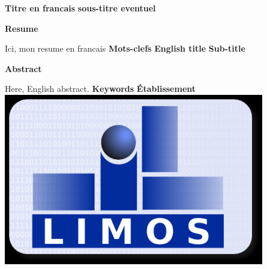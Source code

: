\clearpage
\ifodd\thepage\hbox{}\newpage\else\fi%
\thispagestyle{empty}\parindent=0pt
{\Large \textbf{Titre en francais}}
{\large \textbf{sous-titre eventuel}}
\hrulefill%
\begin{center}
{\Large \textbf{Resume}}
\end{center}
Ici, mon resume en francais
\hrulefill%
{\Large \textbf{Mots-clefs}}
\hrulefill%
{\Large \textbf{English title}}
{\large \textbf{Sub-title}}
\hrulefill%
\begin{center}
{\Large \textbf{Abstract}}
\end{center}
Here, English abstract.
\hrulefill%
{\Large \textbf{Keywords}}
\hrulefill%
\hrulefill
{\Large \textbf{\'Etablissement} }
\hfill\includegraphics[scale=0.5]{./images/logoLimos.png} 
\hrulefill